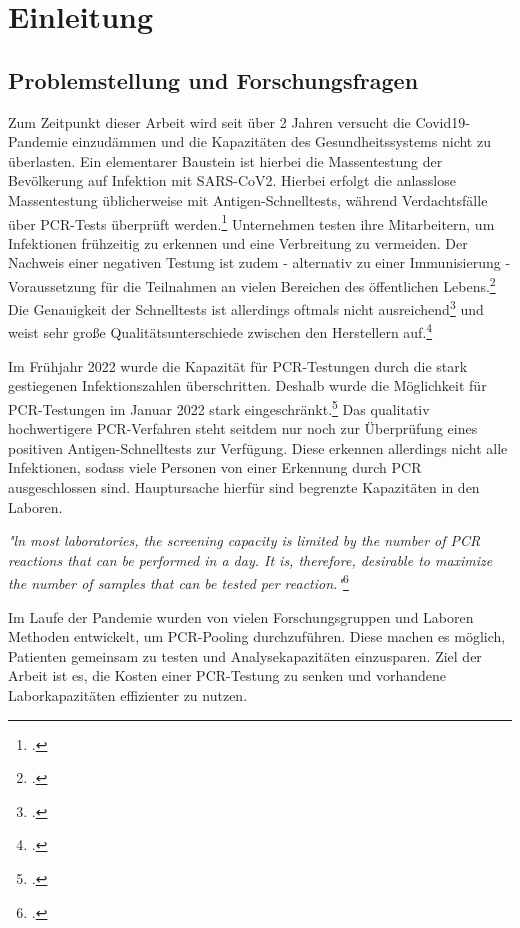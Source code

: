\chapter{Einleitung}
\section{Problemstellung und Forschungsfragen}
Zum Zeitpunkt dieser Arbeit wird seit über 2 Jahren versucht die Covid19-Pandemie einzudämmen und die Kapazitäten des Gesundheitssystems nicht zu überlasten.
Ein elementarer Baustein ist hierbei die Massentestung der Bevölkerung auf Infektion mit SARS-CoV2.
Hierbei erfolgt die anlasslose Massentestung üblicherweise mit Antigen-Schnelltests, während Verdachtsfälle über PCR-Tests überprüft werden.\footcite{bund_testverordnung_2021}
Unternehmen testen ihre Mitarbeitern, um Infektionen frühzeitig zu erkennen und eine Verbreitung zu vermeiden.
Der Nachweis einer negativen Testung ist zudem - alternativ zu einer Immunisierung - Voraussetzung für die Teilnahmen an vielen Bereichen des öffentlichen Lebens.\footcite{land_corona-verordnung_2022}
Die Genauigkeit der Schnelltests ist allerdings oftmals nicht ausreichend\footcite{wagenhauser_clinical_2021} und weist sehr große Qualitätsunterschiede zwischen den Herstellern auf.\footcite{zerforschung_zerforschung_2022}

Im Frühjahr 2022 wurde die Kapazität für PCR-Testungen durch die stark gestiegenen Infektionszahlen überschritten.
Deshalb wurde die Möglichkeit für PCR-Testungen im Januar 2022 stark eingeschränkt.\footcite{land_corona-verordnung_2022}
Das qualitativ hochwertigere PCR-Verfahren steht seitdem nur noch zur Überprüfung eines positiven Antigen-Schnelltests zur Verfügung.
Diese erkennen allerdings nicht alle Infektionen, sodass viele Personen von einer Erkennung durch PCR ausgeschlossen sind.
Hauptursache hierfür sind begrenzte Kapazitäten in den Laboren.

\textit{"ln most laboratories, the screening capacity is limited by the number of PCR reactions that can be performed in a day. It is, therefore, desirable to maximize the number of samples that can be tested per reaction."}\footcite{viehweger_increased_2020}

Im Laufe der Pandemie wurden von vielen Forschungsgruppen und Laboren Methoden entwickelt, um PCR-Pooling durchzuführen.
Diese machen es möglich, Patienten gemeinsam zu testen und Analysekapazitäten einzusparen.
Ziel der Arbeit ist es, die Kosten einer PCR-Testung zu senken und vorhandene Laborkapazitäten effizienter zu nutzen.

